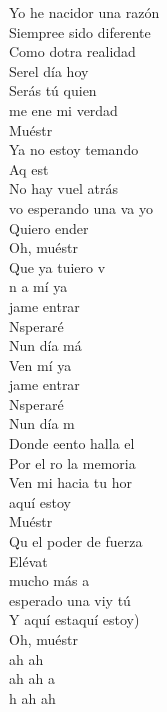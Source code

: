 \begin{cancion}
	Yo he nacidor una razón\\
	\jump
	Siempree sido diferente	\\
	Como dotra realidad\\
	Serel día hoy\\
	\jump
Serás tú quien\\
	me ene mi verdad  \\
	\jump
	Muéstr   \\
	Ya no estoy temando\\
	Aq est\\
	No hay vuel atrás\\
	vo esperando una va yo\\
	\jump
	Quiero ender       \\
	Oh, muéstr   \\
	Que ya tuiero v\\
	\jump
	n a mí ya\\
	jame entrar \\
	Nsperaré\\
	Nun día má\\
	\jump
	Ven mí ya\\
	jame entrar \\
	Nsperaré\\
	Nun día m         \\
	\jump
	Donde eento halla el\\
	Por el ro la memoria\\
	Ven mi hacia tu hor\\
	\jump
aquí estoy\\
	\jump
	\jump
	Muéstr    \\
	Qu el poder de fuerza\\
	Elévat    \\
	mucho más a \\
	\jump
	 esperado una viy tú\\
	Y aquí estaquí estoy)         \\
	Oh, muéstr   \\
	ah ah\\
	ah ah a\\
	h ah ah\\
\end{cancion}%
